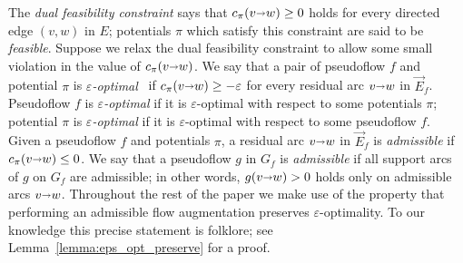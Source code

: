 \documentclass[a4paper,UKenglish]{socg-lipics-v2018}
\makeatletter
\def\note#1{\textcolor{red}{{#1}}}
\def\eps{\varepsilon}
\def\arcto{\mathord\shortrightarrow}
\def\arc#1#2{#1\arcto#2}
\theoremstyle{plain}
\numberwithin{figure}{section}
\def\EMPH#1{\textcolor{BrickRed}{{\emph{#1}}}}
\def\n@te#1{\textsf{\boldmath \textbf{$\langle\!\langle$#1$\rangle\!\rangle$}}\leavevmode}
\def\note#1{\textcolor{red}{\n@te{#1}}}
\makeatother
\begin{document}
The \EMPH{dual feasibility constraint} says that $c_\pi(\arc vw) \geq 0$ holds for every directed edge $(v,w)$ in $E$; potentials $\pi$ which satisfy this constraint are said to be \EMPH{feasible}.
%
%
Suppose we relax the dual feasibility constraint to allow some small violation in the value of $c_\pi(\arc vw)$.
We say that a pair of pseudoflow $f$ and potential $\pi$ is
\EMPH{$\eps$-optimal}~\cite{T85,BE87} if $c_\pi(\arc vw) \geq -\eps$ for every
residual arc $\arc vw$ in $\vec{E}_f$.
Pseudoflow $f$ is \emph{$\eps$-optimal} if it is $\eps$-optimal with respect to
some potentials $\pi$; potential $\pi$ is \emph{$\eps$-optimal} if it is
$\eps$-optimal with respect to some pseudoflow $f$.
%
Given a pseudoflow $f$ and potentials $\pi$, a residual arc $\arc vw$ in $\vec{E}_f$ is
\EMPH{admissible} if $c_\pi(\arc vw) \leq 0$.
We say that a pseudoflow $g$ in $G_f$ is \EMPH{admissible} if all support arcs of $g$ on $G_f$ are admissible; in other words, $g(\arc vw) > 0$ holds only on admissible arcs $\arc vw$.
%
Throughout the rest of the paper we make use of the property that performing
an admissible flow augmentation preserves $\eps$-optimality.
To our knowledge this precise statement is folklore;
see Lemma~\ref{lemma:eps_opt_preserve} for a proof.
\end{document}
